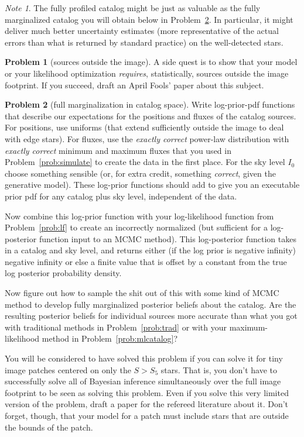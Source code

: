 \documentclass{article}
\theoremstyle{definition}
\newcommand{\problemname}{Problem}
\newtheorem{problem}{\problemname}
\newcommand{\probref}[1]{\problemname~\ref{#1}}
\theoremstyle{remark}
\newcommand{\notename}{Note}
\newtheorem{note}{\notename}[problem]
\begin{document}
\begin{note}
The fully profiled catalog might be just as valuable as the fully marginalized catalog you will obtain below in \probref{prob:fullposterior}.
In particular, it might deliver much better uncertainty estimates (more representative of the actual errors than what is returned by standard practice) on the well-detected stars.
\end{note}

\begin{problem}[sources outside the image]
A side quest is to show that your model or your likelihood optimization \emph{requires}, statistically, sources outside the image footprint.
If you succeed, draft an April Fools' paper about this subject.
\end{problem}

\begin{problem}[full marginalization in catalog space]\label{prob:fullposterior}
Write log-prior-pdf functions that describe our expectations for the positions and fluxes of the catalog sources.
For positions, use uniforms (that extend sufficiently outside the image to deal with edge stars).
For fluxes, use the \emph{exactly correct} power-law distribution with \emph{exactly correct} minimum and maximum fluxes that you used in \probref{prob:simulate} to create the data in the first place.
For the sky level $I_0$ choose something sensible (or, for extra credit, something \emph{correct}, given the generative model).
These log-prior functions should add to give you an executable prior pdf for any catalog plus sky level, independent of the data.

Now combine this log-prior function with your log-likelihood function from \probref{prob:lf} to create an incorrectly normalized (but sufficient for a log-posterior function input to an MCMC method).
This log-posterior function takes in a catalog and sky level, and returns either (if the log prior is negative infinity) negative infinity or else a finite value that is offset by a constant from the true log posterior probability density.

Now figure out how to sample the shit out of this with some kind of MCMC method to develop fully marginalized posterior beliefs about the catalog.
Are the resulting posterior beliefs for individual sources more accurate than what you got with traditional methods in \probref{prob:trad} or with your maximum-likelihood method in \probref{prob:mlcatalog}?

You will be considered to have solved this problem if you can solve it for tiny image patches centered on only the $S>S_5$ stars.
That is, you don't have to successfully solve all of Bayesian inference simultaneously over the full image footprint to be seen as solving this problem.
Even if you solve this very limited version of the problem, draft a paper for the refereed literature about it.
Don't forget, though, that your model for a patch must include stars that are outside the bounds of the patch.
\end{problem}
\end{document}
